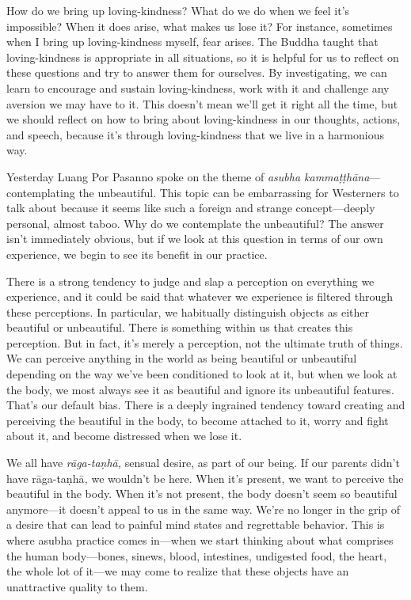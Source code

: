 How do we bring up loving-kindness? What do we do when we feel it's 
impossible? When it does arise, what makes us lose it? For instance, 
sometimes when I bring up loving-kindness myself, fear arises. The 
Buddha taught that loving-kindness is appropriate in all situations, so 
it is helpful for us to reflect on these questions and try to answer 
them for ourselves. By investigating, we can learn to encourage and 
sustain loving-kindness, work with it and challenge any aversion we may 
have to it. This doesn't mean we'll get it right all the time, but we 
should reflect on how to bring about loving-kindness in our thoughts, 
actions, and speech, because it's through loving-kindness that we live 
in a harmonious way.


Yesterday Luang Por Pasanno spoke on the theme of \emph{asubha 
kammaṭṭhāna}---contemplating the unbeautiful. This topic can be 
embarrassing for Westerners to talk about because it seems like such a 
foreign and strange concept---deeply personal, almost taboo. Why do we 
contemplate the unbeautiful? The answer isn't immediately obvious, but 
if we look at this question in terms of our own experience, we begin to 
see its benefit in our practice.

There is a strong tendency to judge and slap a perception on everything 
we experience, and it could be said that whatever we experience is 
filtered through these perceptions. In particular, we habitually 
distinguish objects as either beautiful or unbeautiful. There is 
something within us that creates this perception. But in fact, it's 
merely a perception, not the ultimate truth of things. We can perceive 
anything in the world as being beautiful or unbeautiful depending on 
the way we've been conditioned to look at it, but when we look at the 
body, we most always see it as beautiful and ignore its unbeautiful 
features. That's our default bias. There is a deeply ingrained tendency 
toward creating and perceiving the beautiful in the body, to become 
attached to it, worry and fight about it, and become distressed when we 
lose it.

We all have \emph{rāga-taṇhā,} sensual desire, as part of our 
being. If our parents didn't have rāga-taṇhā\emph{,} we wouldn't be 
here. When it's present, we want to perceive the beautiful in the body. 
When it's not present, the body doesn't seem so beautiful anymore---it 
doesn't appeal to us in the same way. We're no longer in the grip of a 
desire that can lead to painful mind states and regrettable behavior. 
This is where asubha practice comes in---when we start thinking about 
what comprises the human body---bones, sinews, blood, intestines, 
undigested food, the heart, the whole lot of it---we may come to 
realize that these objects have an unattractive quality to them.


